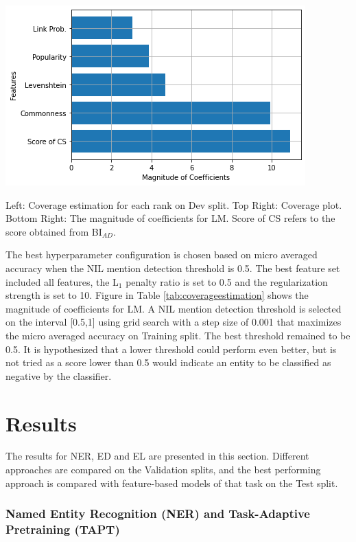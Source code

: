 \documentclass{report}
\theoremstyle{definition}
\theoremstyle{remark}
\begin{document}
\begin{table}
\begin{minipage}{0.5\linewidth}
		\hspace*{-1cm}\includegraphics[scale=0.5]{rerankercoef.png}
	\end{minipage}
	\caption{Left: Coverage estimation for each rank on Dev split. Top Right: Coverage plot. Bottom Right: The magnitude of coefficients for LM. Score of CS refers to the score obtained from BI$_{AD}$.}
	\label{tab:coverageestimation}
\end{table}

The best hyperparameter configuration is chosen based on micro averaged accuracy when the NIL mention detection threshold is 0.5. The best feature set included all features, the L$_1$ penalty ratio is set to 0.5 and the regularization strength is set to 10. Figure in Table \ref{tab:coverageestimation} shows the magnitude of coefficients for LM. A NIL mention detection threshold is selected on the interval [0.5,1] using grid search with a step size of 0.001 that maximizes the micro averaged accuracy on Training split. The best threshold remained to be 0.5. It is hypothesized that a lower threshold could perform even better, but is not tried as a score lower than 0.5 would indicate an entity to be classified as negative by the classifier.

\section{Results}
\label{sec:EvalResults}
The results for NER, ED and EL are presented in this section. Different approaches are compared on the Validation splits, and the best performing approach is compared with feature-based models of that task on the Test split.
\subsubsection{Named Entity Recognition (NER) and Task-Adaptive Pretraining (TAPT)}
\end{document}
